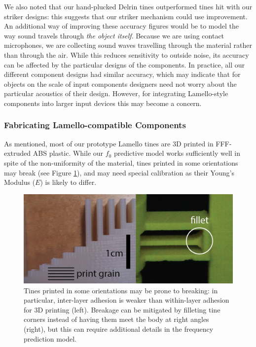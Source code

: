     We also noted that our hand-plucked Delrin tines outperformed tines hit with our striker designs: this suggests that our striker mechanism could use improvement. An additional way of improving these accuracy figures would be to model the way sound travels through \emph{the object itself}. Because we are using contact microphones, we are collecting sound waves travelling through the material rather than through the air. While this reduces sensitivity to outside noise, its accuracy can be affected by the particular designs of the components. In practice, all our different component designs had similar accuracy, which may indicate that for objects on the scale of input components designers need not worry about the particular acoustics of their design. However, for integrating Lamello-style components into larger input devices this may become a concern.

    \subsubsection{Fabricating Lamello-compatible Components}
    
    As mentioned, most of our prototype Lamello tines are 3D printed in FFF-extruded ABS plastic. While our $f_0$ predictive model works sufficiently well in spite of the non-uniformity of the material, tines printed in some orientations may break (see Figure \ref{fig:lamello-break}), and may need special calibration as their Young's Modulus ($E$) is likely to differ.
    
    \begin{figure}
  \centering
    \includegraphics[width=\textwidth]{figures/lamello/fab.png}
  \caption{Tines printed in some orientations may be prone to breaking: in particular, inter-layer adhesion is weaker than within-layer adhesion for 3D printing (left). Breakage can be mitigated by filleting tine corners instead of having them meet the body at right angles (right), but this can require additional details in the frequency prediction model.} 
  \label{fig:lamello-break}
\end{figure}
    

